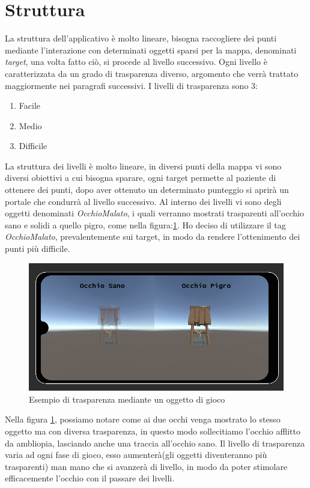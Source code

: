 \documentclass[
a4paper,
cleardoublepage=empty,
headings=twolinechapter,
numbers=autoenddot,
]{scrbook}
\begin{document}
       \section{Struttura}
    La struttura dell'applicativo è molto lineare, bisogna raccogliere dei punti mediante l'interazione con determinati oggetti sparsi per la mappa, denominati \textit{target}, una volta fatto ciò, si procede al livello successivo.
    Ogni livello è caratterizzata da un grado di trasparenza diverso, argomento che verrà trattato maggiormente nei paragrafi successivi.
    I livelli di trasparenza sono 3:
    \begin{enumerate}
    	\item Facile
    	\item Medio
    	\item Difficile
    \end{enumerate}
    La struttura dei livelli è molto lineare, in diversi punti della mappa vi sono diversi obiettivi a cui bisogna sparare, ogni target permette al paziente di ottenere dei punti, dopo aver ottenuto un determinato punteggio si aprirà un portale che condurrà al livello successivo.
    Al interno dei livelli vi sono degli oggetti denominati \textit{OcchioMalato}, i quali verranno mostrati trasparenti all'occhio sano e solidi a quello pigro, come nella figura:\ref{fig:pozzo}.
    Ho deciso di utilizzare il tag \textit{OcchioMalato}, prevalentemente sui target, in modo da rendere l'ottenimento dei punti più difficile. 
    \begin{figure}[H]
    	\centering
    	\includegraphics[width=0.8\linewidth]{image/Pr_trasparenza}
    	\caption{Esempio di trasparenza mediante un oggetto di gioco}
    	\label{fig:pozzo}
    \end{figure}
    Nella figura \ref{fig:pozzo}, possiamo notare come ai due occhi venga mostrato lo stesso oggetto ma con diversa trasparenza, in questo modo sollecitiamo l'occhio afflitto da ambliopia, lasciando anche una traccia all'occhio sano.
    Il livello di trasparenza varia ad ogni fase di gioco, esso aumenterà(gli oggetti diventeranno più trasparenti) man mano che si avanzerà di livello, in modo da poter stimolare efficacemente l'occhio con il passare dei livelli.
\end{document}
